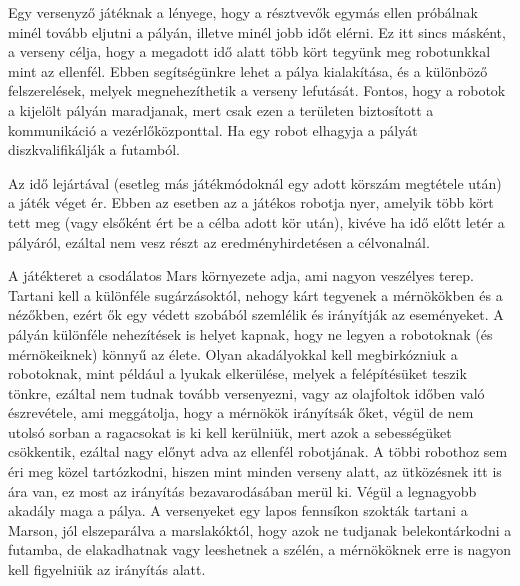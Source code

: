 Egy versenyző játéknak a lényege, hogy a résztvevők egymás ellen próbálnak minél tovább eljutni a pályán, illetve minél jobb időt elérni. Ez itt sincs másként, a verseny célja, hogy a megadott idő alatt több kört tegyünk meg robotunkkal mint az ellenfél. Ebben segítségünkre lehet a pálya kialakítása, és a különböző felszerelések, melyek megnehezíthetik a verseny lefutását. Fontos, hogy a robotok a kijelölt pályán maradjanak, mert csak ezen a területen biztosított a kommunikáció a vezérlőközponttal. Ha egy robot elhagyja a pályát diszkvalifikálják a futamból.

Az idő lejártával (esetleg más játékmódoknál egy adott körszám megtétele után) a játék véget ér. Ebben az esetben az a játékos robotja nyer, amelyik több kört tett meg (vagy elsőként ért be a célba adott kör után), kivéve ha idő előtt letér a pályáról, ezáltal nem vesz részt az eredményhirdetésen a célvonalnál.

A játékteret a csodálatos Mars környezete adja, ami nagyon veszélyes terep. Tartani kell a különféle sugárzásoktól, nehogy kárt tegyenek a mérnökökben és a nézőkben, ezért ők egy védett szobából szemlélik és irányítják az eseményeket. A pályán különféle nehezítések is helyet kapnak, hogy ne legyen a robotoknak (és mérnökeiknek) könnyű az élete. Olyan akadályokkal kell megbirkózniuk a robotoknak, mint például a lyukak elkerülése, melyek a felépítésüket teszik tönkre, ezáltal nem tudnak tovább versenyezni, vagy az olajfoltok időben való észrevétele, ami meggátolja, hogy a mérnökök irányítsák őket, végül de nem utolsó sorban a ragacsokat is ki kell kerülniük, mert azok a sebességüket csökkentik, ezáltal nagy előnyt adva az ellenfél robotjának. A többi robothoz sem éri meg közel tartózkodni, hiszen mint minden verseny alatt, az ütközésnek itt is ára van, ez most az irányítás bezavarodásában merül ki. Végül a legnagyobb akadály maga a pálya. A versenyeket egy lapos fennsíkon szokták tartani a Marson, jól elszeparálva a marslakóktól, hogy azok ne tudjanak belekontárkodni a futamba, de elakadhatnak vagy leeshetnek a szélén, a mérnököknek erre is nagyon kell figyelniük az irányítás alatt.

